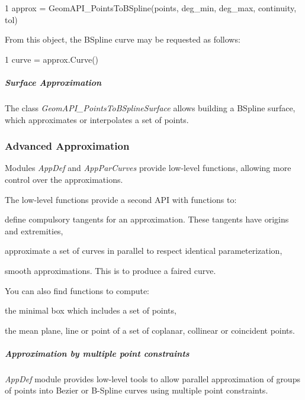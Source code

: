 \begin{DoxyCode}
1 approx = GeomAPI\_PointsToBSpline(points, deg\_min, deg\_max, continuity, tol) 
\end{DoxyCode}


From this object, the B\+Spline curve may be requested as follows\+:


\begin{DoxyCode}
1 curve = approx.Curve()
\end{DoxyCode}


\subparagraph*{Surface Approximation}

The class {\itshape Geom\+A\+P\+I\+\_\+\+Points\+To\+B\+Spline\+Surface} allows building a B\+Spline surface, which approximates or interpolates a set of points.\hypertarget{occt_user_guides__modeling_data_occt_modat_1_1_3}{}\subsubsection{Advanced Approximation}\label{occt_user_guides__modeling_data_occt_modat_1_1_3}
Modules {\itshape App\+Def} and {\itshape App\+Par\+Curves} provide low-\/level functions, allowing more control over the approximations.

The low-\/level functions provide a second A\+PI with functions to\+:
\begin{DoxyItemize}
\item define compulsory tangents for an approximation. These tangents have origins and extremities,
\item approximate a set of curves in parallel to respect identical parameterization,
\item smooth approximations. This is to produce a faired curve.
\end{DoxyItemize}

You can also find functions to compute\+:
\begin{DoxyItemize}
\item the minimal box which includes a set of points,
\item the mean plane, line or point of a set of coplanar, collinear or coincident points.
\end{DoxyItemize}

\subparagraph*{Approximation by multiple point constraints}

{\itshape App\+Def} module provides low-\/level tools to allow parallel approximation of groups of points into Bezier or B-\/\+Spline curves using multiple point constraints.

